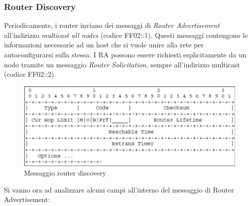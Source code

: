 \documentclass{article}
\begin{document}
\subsubsection{Router Discovery}
Periodicamente, i router inviano dei messaggi di \textit{Router Advertisement} all'indirizzo \textit{multicast all nodes} (codice FF02::1). Questi messaggi contengono le informazioni necessarie ad un host che si vuole unire alla rete per autoconfigurarsi sulla stessa. I RA possono essere richiesti esplicitamente da un nodo tramite un messaggio \textit{Router Solicitation}, sempre all'indirizzo multicast (codice FF02::2).
\begin{figure}[H]
\centering
\includegraphics[scale=0.3]{figures/router discovery.png}
\caption{Messaggio router discovery}
\end{figure}
Si vanno ora ad analizzare alcuni campi all'interno del messaggio di Router Advertisement:
\end{document}
